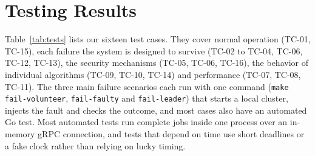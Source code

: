\section{Testing Results}
\label{sec:testing}

Table~\ref{tab:tests} lists our sixteen test cases. They cover normal operation (TC-01, TC-15), each failure the system is designed to survive (TC-02 to TC-04, TC-06, TC-12, TC-13), the security mechanisms (TC-05, TC-06, TC-16), the behavior of individual algorithms (TC-09, TC-10, TC-14) and performance (TC-07, TC-08, TC-11). The three main failure scenarios each run with one command (\texttt{make fail-volunteer}, \texttt{fail-faulty} and \texttt{fail-leader}) that starts a local cluster, injects the fault and checks the outcome, and most cases also have an automated Go test. Most automated tests run complete jobs inside one process over an in-memory gRPC connection, and tests that depend on time use short deadlines or a fake clock rather than relying on lucky timing.


